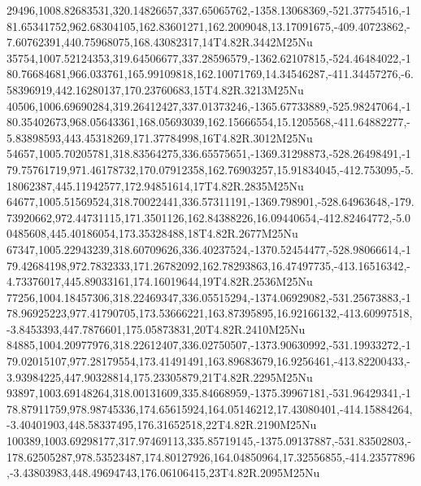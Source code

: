 29496,1008.82683531,320.14826657,337.65065762,-1358.13068369,-521.37754516,-181.65341752,962.68304105,162.83601271,162.2009048,13.17091675,-409.40723862,-7.60762391,440.75968075,168.43082317,14T4.82R.3442M25Nu
35754,1007.52124353,319.64506677,337.28596579,-1362.62107815,-524.46484022,-180.76684681,966.033761,165.99109818,162.10071769,14.34546287,-411.34457276,-6.58396919,442.16280137,170.23760683,15T4.82R.3213M25Nu
40506,1006.69690284,319.26412427,337.01373246,-1365.67733889,-525.98247064,-180.35402673,968.05643361,168.05693039,162.15666554,15.1205568,-411.64882277,-5.83898593,443.45318269,171.37784998,16T4.82R.3012M25Nu
54657,1005.70205781,318.83564275,336.65575651,-1369.31298873,-528.26498491,-179.75761719,971.46178732,170.07912358,162.76903257,15.91834045,-412.753095,-5.18062387,445.11942577,172.94851614,17T4.82R.2835M25Nu
64677,1005.51569524,318.70022441,336.57311191,-1369.798901,-528.64963648,-179.73920662,972.44731115,171.3501126,162.84388226,16.09440654,-412.82464772,-5.00485608,445.40186054,173.35328488,18T4.82R.2677M25Nu
67347,1005.22943239,318.60709626,336.40237524,-1370.52454477,-528.98066614,-179.42684198,972.7832333,171.26782092,162.78293863,16.47497735,-413.16516342,-4.73376017,445.89033161,174.16019644,19T4.82R.2536M25Nu
77256,1004.18457306,318.22469347,336.05515294,-1374.06929082,-531.25673883,-178.96925223,977.41790705,173.53666221,163.87395895,16.92166132,-413.60997518,-3.8453393,447.7876601,175.05873831,20T4.82R.2410M25Nu
84885,1004.20977976,318.22612407,336.02750507,-1373.90630992,-531.19933272,-179.02015107,977.28179554,173.41491491,163.89683679,16.9256461,-413.82200433,-3.93984225,447.90328814,175.23305879,21T4.82R.2295M25Nu
93897,1003.69148264,318.00131609,335.84668959,-1375.39967181,-531.96429341,-178.87911759,978.98745336,174.65615924,164.05146212,17.43080401,-414.15884264,-3.40401903,448.58337495,176.31652518,22T4.82R.2190M25Nu
100389,1003.69298177,317.97469113,335.85719145,-1375.09137887,-531.83502803,-178.62505287,978.53523487,174.80127926,164.04850964,17.32556855,-414.23577896,-3.43803983,448.49694743,176.06106415,23T4.82R.2095M25Nu
